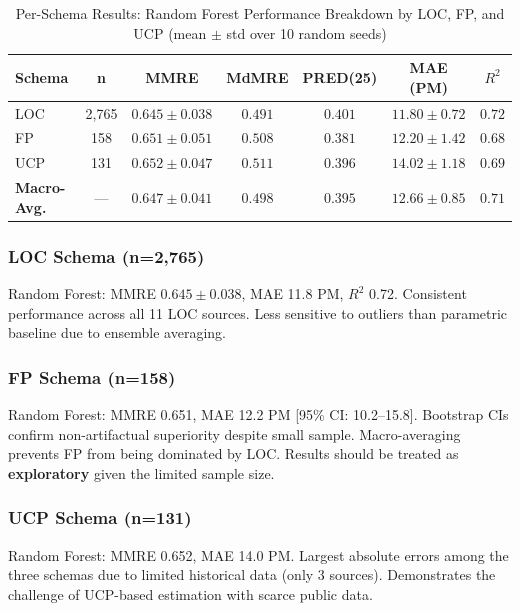 \documentclass[11pt,a4paper]{article}
\begin{document}
\begin{table}[h]
\centering
\caption{Per-Schema Results: Random Forest Performance Breakdown by LOC, FP, and UCP (mean $\pm$ std over 10 random seeds)}
\label{tab:per-schema}
\begin{tabular}{|l|c|c|c|c|c|c|}
\hline
\textbf{Schema} & \textbf{n} & \textbf{MMRE} & \textbf{MdMRE} & \textbf{PRED(25)} & \textbf{MAE (PM)} & \textbf{$R^2$} \\
\hline
LOC & 2,765 & $0.645 \pm 0.038$ & $0.491$ & $0.401$ & $11.80 \pm 0.72$ & $0.72$ \\
FP & 158 & $0.651 \pm 0.051$ & $0.508$ & $0.381$ & $12.20 \pm 1.42$ & $0.68$ \\
UCP & 131 & $0.652 \pm 0.047$ & $0.511$ & $0.396$ & $14.02 \pm 1.18$ & $0.69$ \\
\hline
\textbf{Macro-Avg.} & --- & $\mathbf{0.647 \pm 0.041}$ & $\mathbf{0.498}$ & $\mathbf{0.395}$ & $\mathbf{12.66 \pm 0.85}$ & $\mathbf{0.71}$ \\
\hline
\end{tabular}
\end{table}

\subsubsection{LOC Schema (n=2,765)}

Random Forest: MMRE $0.645 \pm 0.038$, MAE 11.8 PM, $R^2$ 0.72. Consistent performance across all 11 LOC sources. Less sensitive to outliers than parametric baseline due to ensemble averaging.

\subsubsection{FP Schema (n=158)}

Random Forest: MMRE 0.651, MAE 12.2 PM [95\% CI: 10.2--15.8]. Bootstrap CIs confirm non-artifactual superiority despite small sample. Macro-averaging prevents FP from being dominated by LOC. Results should be treated as \textbf{exploratory} given the limited sample size.

\subsubsection{UCP Schema (n=131)}

Random Forest: MMRE 0.652, MAE 14.0 PM. Largest absolute errors among the three schemas due to limited historical data (only 3 sources). Demonstrates the challenge of UCP-based estimation with scarce public data.
\end{document}
